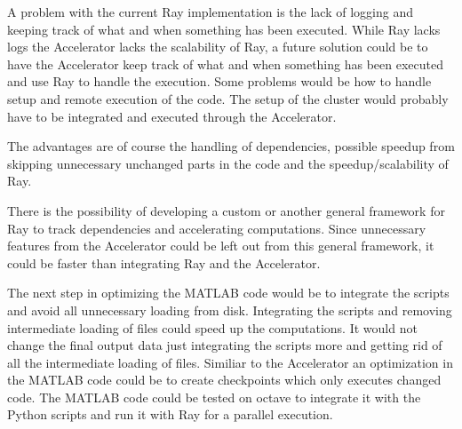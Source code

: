 \documentclass[12pt, a4paper]{article}
\begin{document}
A problem with the current Ray implementation is the lack of logging and keeping track of what and when something has been executed.
While Ray lacks logs the Accelerator lacks the scalability of Ray, a future solution could be to have the Accelerator keep track of what and when something has been executed and use Ray to handle the execution.
Some problems would be how to handle setup and remote execution of the code.
The setup of the cluster would probably have to be integrated and executed through the Accelerator.

The advantages are of course the handling of dependencies, possible speedup from skipping unnecessary unchanged parts in the code and the speedup/scalability of Ray.

There is the possibility of developing a custom or another general framework for Ray to track dependencies and accelerating computations.
Since unnecessary features from the Accelerator could be left out from this general framework, it could be faster than integrating Ray and the Accelerator.

The next step in optimizing the MATLAB code would be to integrate the scripts and avoid all unnecessary loading from disk.
Integrating the scripts and removing intermediate loading of files could speed up the computations.
It would not change the final output data just integrating the scripts more and getting rid of all the intermediate loading of files.
Similiar to the Accelerator an optimization in the MATLAB code could be to create checkpoints which only executes changed code.
The MATLAB code could be tested on octave to integrate it with the Python scripts and run it with Ray for a parallel execution.



\end{document}
